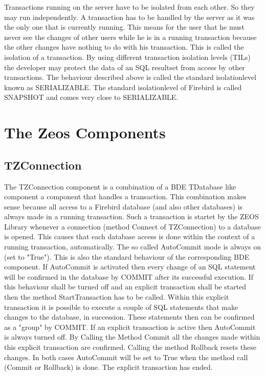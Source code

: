 \documentclass[a4paper,12pt,oneside]{book}
\begin{document}
Transactions running on the server have to be isolated from each other.
So they may run independently.
A transaction has to be handled by the server as it was the only one that is currently running.
This means for the user that he must never see the changes of other users while he is in a running transaction because the other changes have nothing to do with his transaction.
This is called the isolation of a transaction.
By using different transaction isolation levels (TILs) the developer may protect the data of an SQL resultset from access by other transactions.
The behaviour described above is called the standard isolationlevel known as SERIALIZABLE.
The standard isolationlevel of Firebird is called SNAPSHOT and comes very close to SERIALIZABLE.

\section{The Zeos Components}

\subsection{TZConnection}
The TZConnection component is a combination of a BDE TDatabase like component a component that
handles a transaction.
This combination makes sense because all access to a Firebird database (and also other databases) is always made in a running transaction.
Such a transaction is startet by the ZEOS Library whenever a connection (method Connect of TZConnection) to a database is opened.
This causes that each database access is done within the context of a running transaction, automatically.
The so called AutoCommit mode is always on (set to "True").
This is also the standard behaviour of the corresponding BDE component.
If AutoCommit is activated then every change of an SQL statement will be confirmed in the database by COMMIT after its successful execution.
If this behaviour shall be turned off and an explicit transaction shall be started then the method StartTransaction has to be called.
Within this explicit transaction it is possible to execute a couple of SQL statements that make changes to the database, in succession.
These statements then can be confirmed as a "group" by COMMIT.
If an explicit transaction is active then AutoCommit is always turned off.
By Calling the Method Commit all the changes made within this explicit transaction are confirmed.
Calling the method Rollback resets these changes.
In both cases AutoCommit will be set to True when the method call (Commit or Rollback) is done.
The explicit transaction has ended.
\end{document}
